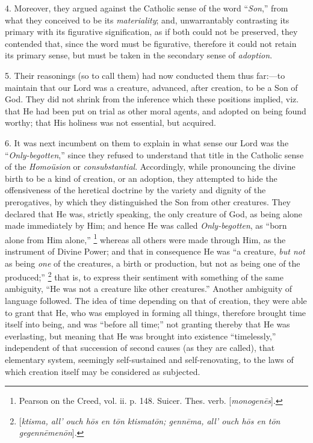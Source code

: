4. Moreover, they argued against the Catholic sense of the word
``\emph{Son},'' from what they conceived to be its \emph{materiality};
and, unwarrantably contrasting its primary with its figurative
signification, as if both could not be preserved, they contended that,
since the word must be figurative, therefore it could not retain its
primary sense, but must be taken in the secondary sense of \emph{adoption}.

5. Their reasonings (so to call them) had now conducted them thus
far:—to maintain that our Lord was a creature, advanced, after
creation, to be a Son of God. They did not shrink from the inference
which these positions implied, viz. that He had been put on trial as
other moral agents, and adopted on being found worthy; that His
holiness was not essential, but acquired.

6. It was next incumbent on them to explain in what sense our Lord
was the ``\emph{Only-begotten},'' since they refused to
understand that title in the Catholic sense of the \emph{Homoüsion}
or \emph{consubstantial}. Accordingly, while pronouncing the
divine birth to be a kind of creation, or an adoption, they attempted
to hide the offensiveness of the heretical doctrine by the variety and
dignity of the prerogatives, by which they distinguished the Son from
other creatures. They declared that He was, strictly speaking, the
only creature of God, as being alone made immediately by Him; and
hence He was called \emph{Only-begotten}, as ``born alone from Him
alone,'' \footnote{Pearson on the Creed, vol. ii. p. 148.
Suicer. Thes. verb. [\emph{monogen\={e}s}].} whereas
all others were made through Him, as the instrument of Divine Power;
and that in consequence He was ``a creature, \emph{but not} as
being \emph{one} of the creatures, a birth or production, but not as
being one of the produced;'' \footnote{[\emph{ktisma, all' ouch h\={o}s en t\={o}n
ktismat\={o}n; genn\={e}ma, all' ouch h\={o}s en t\={o}n
gegenn\={e}men\={o}n}].} that is, to express their sentiment with something of the same
ambiguity, ``He was not a creature like other creatures.''
Another ambiguity of language followed. The idea of time depending on
that of creation, they were able to grant that He, who was employed in
forming all things, therefore brought time itself into being, and was
``before all time;'' not granting thereby that He was
everlasting, but meaning that He was brought into existence
``timelessly,'' independent of that succession of second
causes (as they are called), that elementary system, seemingly
self-sustained and self-renovating, to the laws of which creation
itself may be considered as subjected.

